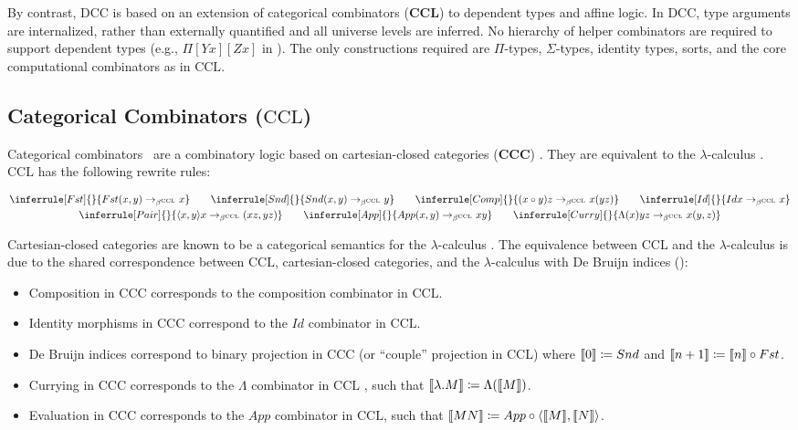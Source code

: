 \documentclass{lmcs}
\newcommand{\ccc}{\(\text{CCC}\)} %
\newcommand{\cccbf}{\(\textbf{CCC}\)} %
\newcommand{\ccl}{\(\text{CCL}\)} %
\newcommand{\cclbf}{\(\textbf{CCL}\)} %
\newcommand{\ccle}{\text{CCL}}
\newcommand{\la}{\langle}
\newcommand{\ra}{\rangle}
\newcommand{\arr}{\rightarrow}
\newcommand{\barrc}[1]{\arr_{\beta^{#1}}}
\begin{document}
By contrast, DCC is based on an extension of categorical combinators (\cclbf) to dependent types and affine logic. In DCC, type arguments are internalized, rather than externally quantified and all universe levels are inferred. No hierarchy of helper combinators are required to support dependent types (e.g., \(\Pi[Y x][Z x]\) in \autocite[10:17][lines 5-7]{altenkirch}). The only constructions required are \(\Pi\)-types, \(\Sigma\)-types, identity types, sorts, and the core computational combinators as in \ccl{}.

\subsection*{Categorical Combinators (\texorpdfstring{\ccl}{CCL})}

Categorical combinators~\cite{cmachine,CURIEN1986188} are a combinatory logic based on cartesian-closed categories (\cccbf) \cite{nlab:ccc}. They are equivalent to the \(\lambda\)-calculus \autocite[p. 205][theorem 2.20]{CURIEN1986188}. \ccl{} has the following rewrite rules:

\begin{gather*}
  \inferrule[Fst]
  { }
  { Fst (x, y) \barrc{\ccle} x} \qquad
  \inferrule[Snd]
  { }
  { Snd (x, y) \barrc{\ccle} y} \qquad
  \inferrule[Comp]
  { }
  {(x \circ y) z \barrc{\ccle} x (y z)}\qquad
  \inferrule[Id]
  { }
  {Id x \barrc{\ccle} x}\\
  \inferrule[Pair]
  { }
  {\la x, y \ra x \barrc{\ccle} (x z, y z)}\qquad
  \inferrule[App]
  { }
  { App (x, y) \barrc{\ccle} x y}\qquad
  \inferrule[Curry]
  { }
  { \Lambda(x) y z \barrc{\ccle} x (y, z)}
\end{gather*}

Cartesian-closed categories are known to be a categorical semantics for the \(\lambda\)-calculus \cite{lambek1988introduction}. The equivalence between \ccl{} and the \(\lambda\)-calculus \autocite[p. 205][theorem 2.20]{CURIEN1986188} is due to the shared correspondence \autocite[p. 6]{cmachine} between \ccl, cartesian-closed categories, and the \(\lambda\)-calculus with De Bruijn indices (\cite{de1972lambda}):

\begin{itemize}\label{coup}
  \item Composition in \ccc{} corresponds to the composition combinator in \ccl.
  \item Identity morphisms in \ccc{} correspond to the \(Id\) combinator in \ccl.
  \item De Bruijn indices correspond to binary projection in \ccc{} (or ``couple'' projection in \ccl) where \(\compile{0} \coloneq Snd\) and \(\compile{n + 1} \coloneq \compile{n} \circ Fst\).
  \item Currying in \ccc{} corresponds to the \(\Lambda\) combinator in \ccl{} \autocite[p. 176][line 5]{cmachine}, such that \(\compile{\lambda . M} \coloneq \Lambda(\compile{M})\).
  \item Evaluation in \ccc{} corresponds to the \(App\) combinator in \ccl, such that \(\compile{M N} \coloneq \comp{App}{\pair{\compile{M}, \compile{N}}}\).
\end{itemize}
\end{document}
